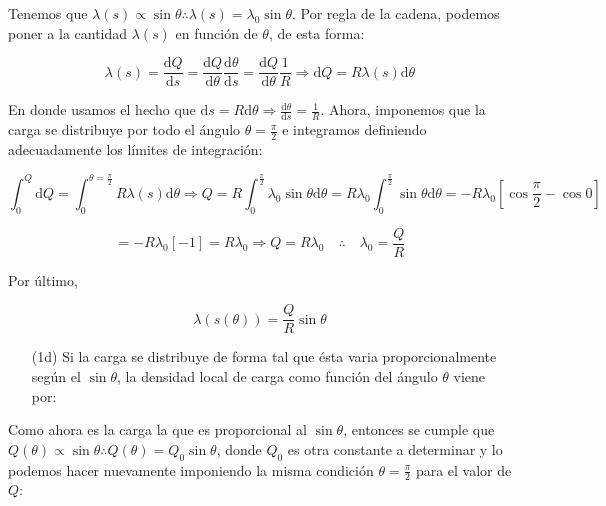 \documentclass[a4paper,10pt]{article}
\begin{document}
Tenemos que $\lambda(s)\varpropto\sin\theta\therefore\lambda(s)=\lambda_{0}\sin\theta$.
Por regla de la cadena, podemos poner a la cantidad $\lambda(s)$ en funci\'on de
$\theta$, de esta forma:

\begin{equation*}
    \lambda(s)=\frac{\mathrm{d}Q}{\mathrm{d}s}
    =\frac{\mathrm{d}Q}{\mathrm{d}\theta}\frac{\mathrm{d}\theta}{\mathrm{d}s}
    =\frac{\mathrm{d}Q}{\mathrm{d}\theta}\frac{1}{R}
    \Longrightarrow\mathrm{d}Q=R\lambda(s)\mathrm{d}\theta
\end{equation*}

En donde usamos el hecho que
$\mathrm{d}s=R\mathrm{d}\theta\Longrightarrow\frac{\mathrm{d}\theta}{\mathrm{d}s}=\frac{1}{R}$.
Ahora, imponemos que la carga se distribuye por todo el \'angulo $\theta=\frac{\pi}{2}$
e integramos definiendo adecuadamente los l\'imites de integraci\'on:

\begin{equation*}
    \int_{0}^{Q}\mathrm{d}Q=\int_{0}^{\theta=\frac{\pi}{2}}R\lambda(s)\mathrm{d}\theta
    \Longrightarrow Q=R\int_{0}^{\frac{\pi}{2}}\lambda_{0}\sin\theta\mathrm{d}\theta
    =R\lambda_{0}\int_{0}^{\frac{\pi}{2}}\sin\theta\mathrm{d}\theta
    =-R\lambda_{0}\left[\cos\frac{\pi}{2}-\cos0\right]
\end{equation*}

\begin{equation*}
    =-R\lambda_{0}[-1]
    =R\lambda_{0}
    \Longrightarrow Q=R\lambda_{0}
    \quad\therefore\quad\lambda_{0}=\frac{Q}{R}
\end{equation*}

Por \'ultimo,

\begin{equation*}
    \boxed{\lambda(s(\theta))=\frac{Q}{R}\sin\theta}
\end{equation*}

\begin{itemize}
    \item[(1d)]Si la carga se distribuye de forma tal que ésta varia proporcionalmente
    según el $\sin\theta$, la densidad local de carga como función del ángulo $\theta$ viene por:
\end{itemize}


Como ahora es la carga la que es proporcional al $\sin\theta$, entonces se cumple
que $Q(\theta)\varpropto\sin\theta\therefore Q(\theta)=Q_{0}\sin\theta$,
donde $Q_{0}$ es otra constante a determinar y lo podemos hacer nuevamente
imponiendo la misma condici\'on $\theta=\frac{\pi}{2}$ para el valor de $Q$:
\end{document}
